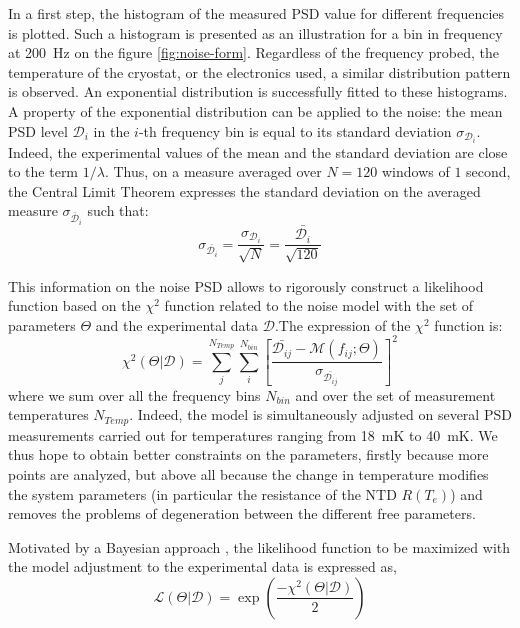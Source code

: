 In a first step, the histogram of the measured PSD value for different frequencies is plotted. Such a histogram is presented as an illustration for a bin in frequency at \SI{200}{\Hz} on the figure \ref{fig:noise-form}. Regardless of the frequency probed, the temperature of the cryostat, or the electronics used, a similar distribution pattern is observed. An exponential distribution is successfully fitted to these histograms. A property of the exponential distribution can be applied to the noise: the mean PSD level $\mathcal{D}_i$ in the $i$-th frequency bin is equal to its standard deviation $\sigma_{\mathcal{D}_i}$. Indeed, the experimental values of the mean and the standard deviation are close to the term $1/\lambda$.
Thus, on a measure averaged over $N=120$ windows of $1$ second, the Central Limit Theorem expresses the standard deviation on the averaged measure $\sigma_{\bar{\mathcal{D}}_i}$ such that:
\begin{equation}
\label{eq:sigma-psd}
\sigma_{\bar{\mathcal{D}_i}} = \frac{\sigma_{\mathcal{D}_i}}{\sqrt{N}} = \frac{\bar{\mathcal{D}_i}}{\sqrt{120}}
\end{equation}

This information on the noise PSD   allows to rigorously construct a likelihood function based on the $\chi^2$ function related to the noise model with the set of parameters $\Theta$ and the experimental data $\mathcal{D}$.The expression of the $\chi^2$ function is:
\begin{equation}
\label{chi2}
\chi ^2 (\Theta|\mathcal{D}) = \sum^{N_{Temp}}_{j} \sum^{N_{bin}}_{i} \left[ \frac{\bar{\mathcal{D}_{ij}} - \mathcal{M}(f_{ij}; \Theta)}{\sigma_{\bar{\mathcal{D}_{ij}}}} \right]^2
\end{equation}
where we sum over all the frequency bins $N_{bin}$ and over the set of measurement temperatures $N_{Temp}$. Indeed, the model is simultaneously adjusted on several PSD measurements carried out for temperatures ranging from \SI{18}{\milli\kelvin} to \SI{40}{\milli\kelvin}. We thus hope to obtain better constraints on the parameters, firstly because more points are analyzed, but above all because the change in temperature modifies the system parameters (in particular the resistance of the NTD $R(T_e)$) and removes the problems of degeneration between the different free parameters.

Motivated by a Bayesian approach \cite{Billard:2012}, the likelihood function to be maximized with the model adjustment to the experimental data is expressed as,
\begin{equation}
\label{likelihood}
\mathcal{L}(\Theta | \mathcal{D}) = \exp{\left(\frac{-\chi ^2 (\Theta|\mathcal{D})}{2}\right)}
\end{equation}

